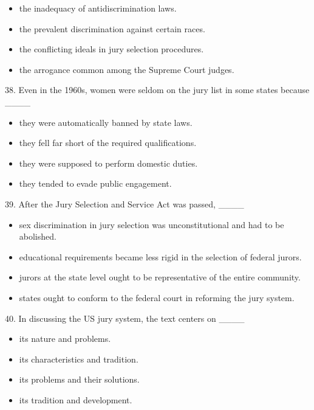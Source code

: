 \documentclass[UTF8,11pt]{ctexart}
\begin{document}
\begin{itemize}[leftmargin=2em,itemsep=.2em,topsep=.4em]\item[A.] the inadequacy of antidiscrimination laws.
\item[B.] the prevalent discrimination against certain races.
\item[C.] the conflicting ideals in jury selection procedures.
\item[D.] the arrogance common among the Supreme Court judges.
\end{itemize}

38. Even in the 1960s, women were seldom on the jury list in some states because \_\_\_\_


\begin{itemize}[leftmargin=2em,itemsep=.2em,topsep=.4em]\item[A.] they were automatically banned by state laws.
\item[B.] they fell far short of the required qualifications.
\item[C.] they were supposed to perform domestic duties.
\item[D.] they tended to evade public engagement.
\end{itemize}

39. After the Jury Selection and Service Act was passed, \_\_\_\_


\begin{itemize}[leftmargin=2em,itemsep=.2em,topsep=.4em]\item[A.] sex discrimination in jury selection was unconstitutional and had to be abolished.
\item[B.] educational requirements became less rigid in the selection of federal jurors.
\item[C.] jurors at the state level ought to be representative of the entire community.
\item[D.] states ought to conform to the federal court in reforming the jury system.
\end{itemize}

40. In discussing the US jury system, the text centers on \_\_\_\_


\begin{itemize}[leftmargin=2em,itemsep=.2em,topsep=.4em]\item[A.] its nature and problems.
\item[B.] its characteristics and tradition.
\item[C.] its problems and their solutions.
\item[D.] its tradition and development.
\end{itemize}
\end{document}
